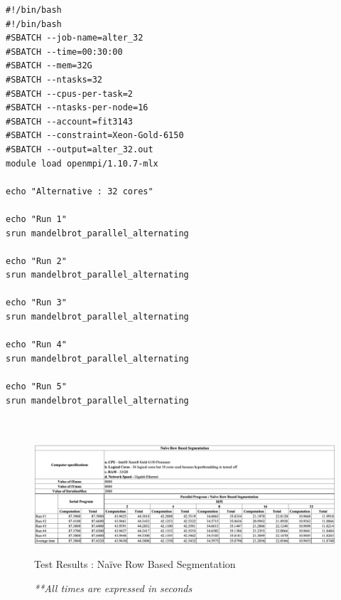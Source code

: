 \documentclass[conference]{IEEEtran}
\begin{document}
\begin{lstlisting}[caption={MonARCH job script for 32 cores},label={32job}]
#!/bin/bash
#!/bin/bash
#SBATCH --job-name=alter_32
#SBATCH --time=00:30:00
#SBATCH --mem=32G
#SBATCH --ntasks=32
#SBATCH --cpus-per-task=2
#SBATCH --ntasks-per-node=16
#SBATCH --account=fit3143
#SBATCH --constraint=Xeon-Gold-6150
#SBATCH --output=alter_32.out
module load openmpi/1.10.7-mlx

echo "Alternative : 32 cores"

echo "Run 1"
srun mandelbrot_parallel_alternating

echo "Run 2"
srun mandelbrot_parallel_alternating

echo "Run 3"
srun mandelbrot_parallel_alternating

echo "Run 4"
srun mandelbrot_parallel_alternating

echo "Run 5"
srun mandelbrot_parallel_alternating



\end{lstlisting}
\newpage
	\begin{figure}
	\centering
	\includegraphics[width=\textheight,height=\textwidth,keepaspectratio]{NaiveCal}
	\caption{Test Results : Naïve Row Based Segmentation}
	\label{app:n}
	\caption*{\emph{**All times are expressed in seconds}}
\end{figure}
\end{document}
